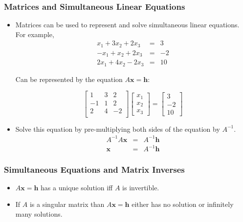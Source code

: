 \documentclass{beamer}
\newcommand{\Mtx}[1]{\ensuremath{\mathbf{#1}}}
\newcommand{\Inv}[1]{\ensuremath{#1^{-1}}}
\begin{document}
\begin{frame}
  \frametitle{Matrices and Simultaneous Linear Equations}

\begin{itemize}

\item Matrices can be used to represent and solve simultaneous linear equations. For example,
\begin{eqnarray*}
x_1 + 3x_2 + 2x_3 & = & 3\\
-x_1 + x_2 + 2x_3 & = & -2\\
2x_1 + 4x_2 -2x_3 & = & 10
\end{eqnarray*}

\medskip
Can be represented by the equation $A\Mtx{x} = \Mtx{h}$:

\[
\left[
\begin{array}{ccc}
1 & 3 & 2 \\
-1 & 1 & 2 \\
2 & 4 & -2 \\
\end{array}
\right]
\left[
\begin{array}{c}
x_1 \\ x_2 \\ x_3
\end{array}
\right]
=
\left[
\begin{array}{c}
3 \\ -2 \\ 10
\end{array}
\right]
\]


\item Solve this equation by pre-multiplying both sides of the equation by \Inv{A}.
\begin{eqnarray*}
\Inv{A} A \Mtx{x} & = &\Inv{A} \Mtx{h} \\
\Mtx{x} & = &  \Inv{A} \Mtx{h}
\end{eqnarray*}

\end{itemize}


\end{frame}

\begin{frame}
  \frametitle{Simultaneous Equations and Matrix Inverses}

\begin{itemize}
\item $A\Mtx{x} = \Mtx{h}$ has a unique solution iff $A$ is invertible.

\item If $A$ is a singular matrix than $A\Mtx{x} = \Mtx{h}$ either has no solution or infinitely many solutions.

\end{itemize}

\end{frame}
\end{document}
